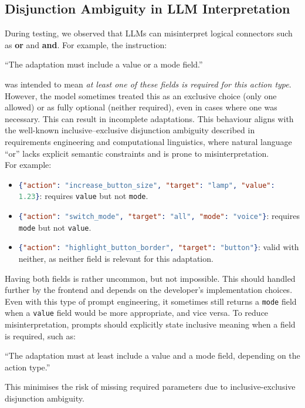 \documentclass[openany]{book}
\newcommand{\mdblockquote}[1]{  \begin{myquote}  #1  \end{myquote}  }
\begin{document}
\subsection{Disjunction Ambiguity in LLM Interpretation}
During testing, we observed that LLMs can misinterpret logical connectors such as \textbf{or} and \textbf{and}. For example, the instruction:
\mdblockquote{“The adaptation must include a value or a mode field.”}
was intended to mean \textit{at least one of these fields is required for this action type}. However, the model sometimes treated this as an exclusive choice (only one allowed) or as fully optional (neither required), even in cases where one was necessary. This can result in incomplete adaptations. This behaviour aligns with the well-known inclusive–exclusive disjunction ambiguity described in requirements engineering and computational linguistics, where natural language “or” lacks explicit semantic constraints and is prone to misinterpretation. \\
For example:
\begin{itemize}
    \item \lstinline[language=json]|{"action": "increase_button_size", "target": "lamp", "value": 1.23}|: requires \texttt{value} but not \texttt{mode}.
    \item \lstinline[language=json]|{"action": "switch_mode", "target": "all", "mode": "voice"}|: requires \texttt{mode} but not \texttt{value}.
    \item \lstinline[language=json]|{"action": "highlight_button_border", "target": "button"}|: valid with neither, as neither field is relevant for this adaptation.
\end{itemize}
Having both fields is rather uncommon, but not impossible. This should handled further by the frontend and depends on the developer's implementation choices. Even with this type of prompt engineering, it sometimes still returns a \texttt{mode} field when a \texttt{value} field would be more appropriate, and vice versa.
To reduce misinterpretation, prompts should explicitly state inclusive meaning when a field is required, such as:
\mdblockquote{“The adaptation must at least include a value and a mode field, depending on the action type.”}
This minimises the risk of missing required parameters due to inclusive-exclusive disjunction ambiguity.
\end{document}
